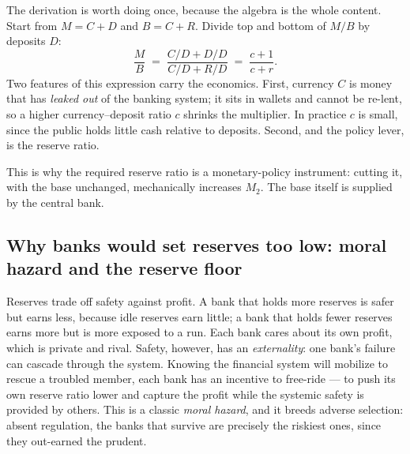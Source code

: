 The derivation is worth doing once, because the algebra is the whole content. Start from $M = C + D$ and $B = C + R$. Divide top and bottom of $M/B$ by deposits $D$:
\[
\frac{M}{B} \;=\; \frac{C/D + D/D}{C/D + R/D} \;=\; \frac{c + 1}{c + r}.
\]
Two features of this expression carry the economics. First, currency $C$ is money that has \emph{leaked out} of the banking system; it sits in wallets and cannot be re-lent, so a higher currency--deposit ratio $c$ shrinks the multiplier. In practice $c$ is small, since the public holds little cash relative to deposits. Second, and the policy lever, is the reserve ratio.


This is why the required reserve ratio is a monetary-policy instrument: cutting it, with the base unchanged, mechanically increases $M_2$. The base itself is supplied by the central bank.


\subsection{Why banks would set reserves too low: moral hazard and the reserve floor}

Reserves trade off safety against profit. A bank that holds more reserves is safer but earns less, because idle reserves earn little; a bank that holds fewer reserves earns more but is more exposed to a run. Each bank cares about its own profit, which is private and rival. Safety, however, has an \emph{externality}: one bank's failure can cascade through the system. Knowing the financial system will mobilize to rescue a troubled member, each bank has an incentive to free-ride --- to push its own reserve ratio lower and capture the profit while the systemic safety is provided by others. This is a classic \emph{moral hazard}, and it breeds adverse selection: absent regulation, the banks that survive are precisely the riskiest ones, since they out-earned the prudent.

